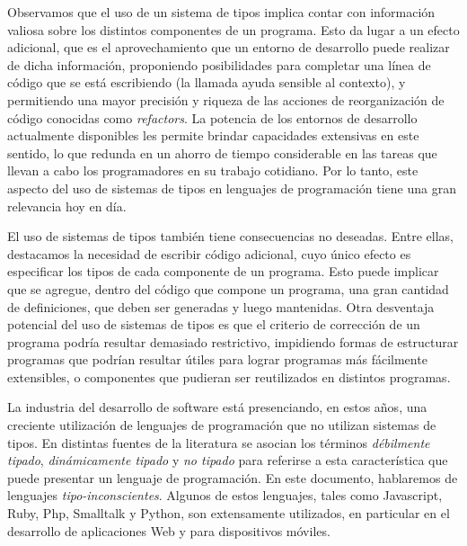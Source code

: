 \documentclass[a4paper,10pt]{article}
\begin{document}
Observamos que el uso de un sistema de tipos implica contar con información valiosa sobre los distintos componentes de un programa. 
Esto da lugar a un efecto adicional, que es el aprovechamiento que un entorno de desarrollo\cite{haber86a} puede realizar de dicha información, proponiendo posibilidades para completar una línea de código que se está escribiendo (la llamada ayuda sensible al contexto)\cite{haber86a}, y permitiendo una mayor precisión y riqueza de las acciones de reorganización de código conocidas como \emph{refactors}\cite{Opdyke92a}.  
La potencia de los entornos de desarrollo actualmente disponibles les permite brindar capacidades extensivas en este sentido, lo que redunda en un ahorro de tiempo considerable en las tareas que llevan a cabo los programadores en su trabajo cotidiano. Por lo tanto, este aspecto del uso de sistemas de tipos en lenguajes de programación tiene una gran relevancia hoy en día.

El uso de sistemas de tipos también tiene consecuencias no deseadas\cite{klein12a,hanen10a}.
Entre ellas, destacamos la necesidad de escribir código adicional, cuyo único efecto es especificar los tipos de cada componente de un programa. Esto puede implicar que se agregue, dentro del código que compone un programa, una gran cantidad de definiciones, que deben ser generadas y luego mantenidas.
Otra desventaja potencial del uso de sistemas de tipos es que el criterio de corrección de un programa podría resultar demasiado restrictivo, impidiendo formas de estructurar programas que podrían resultar útiles\cite{Card85c} para lograr programas más fácilmente extensibles, o componentes que pudieran ser reutilizados en distintos programas.

La industria del desarrollo de software está presenciando, en estos años, una creciente utilización de lenguajes de programación que no utilizan sistemas de tipos. 
En distintas fuentes de la literatura se asocian los términos \emph{débilmente tipado}, \emph{dinámicamente tipado} y \emph{no tipado}\cite{Pier02a,Card85c} para referirse a esta característica que puede presentar un lenguaje de programación. En este documento, hablaremos de lenguajes \emph{tipo-inconscientes}. 
Algunos de estos lenguajes, tales como Javascript, Ruby, Php, Smalltalk y Python, son extensamente utilizados, en particular en el desarrollo de aplicaciones Web y para dispositivos móviles.
\end{document}
